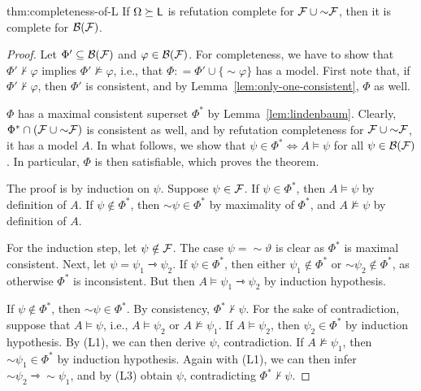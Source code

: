\documentclass[a4paper,english,fleqn,11pt,final]{scrartcl}
\makeatletter
\newcommand{\ie}{i.e.\@\xspace}
\newcommand{\negg}{{\sim}}
\newcommand{\calB}{\protect\ensuremath{\mathcal{B}}}
\newcommand{\calF}{\protect\ensuremath{\mathcal{F}}}
\newcommand{\sfL}{\protect\ensuremath{\mathsf{L}}}
\providecommand{\dfn}{\mathrel{\mathop:}=}
\newcommand{\timp}{\rightarrowtriangle}
\newcommand{\Deriv}[1]{{\normalfont\textsf{#1}}}
\theoremstyle{plain}
\theoremstyle{definition}
\makeatother
\begin{document}
\begin{reptheorem}{thm:completeness-of-L}
If $\Omega \succeq \sfL$ is refutation complete for $\calF \cup \negg \calF$, then it is complete for $\calB(\calF)$.
\end{reptheorem}
\begin{proof}
Let $\Phi' \subseteq \calB(\calF)$ and $\varphi \in \calB(\calF)$.
For completeness, we have to show that $\Phi' \nvdash \varphi$ implies $\Phi' \nvDash \varphi$, \ie, that $\Phi \dfn \Phi' \cup \{\negg\varphi\}$ has a model.
First note that, if $\Phi' \nvdash \varphi$, then $\Phi'$ is consistent, and by Lemma~\ref{lem:only-one-consistent}, $\Phi$ as well.




$\Phi$ has a maximal consistent superset $\Phi^*$ by Lemma~\ref{lem:lindenbaum}.
Clearly, $\Phi^* \cap (\calF \cup \negg \calF)$ is consistent as well, and by refutation completeness for $\calF \cup \negg \calF$, it has a model $A$.
In what follows, we show that $\psi \in \Phi^* \Leftrightarrow A\vDash \psi$ for all $\psi \in \calB(\calF)$.
In particular, $\Phi$ is then satisfiable, which proves the theorem.

The proof is by induction on $\psi$.
Suppose $\psi \in \calF$.
If $\psi \in\Phi^*$, then $A\vDash\psi$ by definition of $A$.
If $\psi \notin \Phi^*$, then $\negg\psi \in \Phi^*$ by maximality of $\Phi^*$, and $A \nvDash \psi$ by definition of $A$.

For the induction step, let $\psi \notin \calF$.
The case $\psi = \negg \vartheta$ is clear as $\Phi^*$ is maximal consistent.
Next, let $\psi = \psi_1 \timp \psi_2$.
If $\psi\in\Phi^*$, then either $\psi_1\notin\Phi^*$ or $\negg\psi_2\notin\Phi^*$, as otherwise $\Phi^*$ is inconsistent.
But then $A\vDash\psi_1\timp\psi_2$ by induction hypothesis.

If $\psi\notin\Phi^*$, then $\negg\psi\in\Phi^*$.
By consistency, $\Phi^* \nvdash \psi$.
For the sake of contradiction, suppose that $A \vDash \psi$, \ie, $A \vDash \psi_2$ or $A \nvDash \psi_1$.
If $A\vDash\psi_2$, then $\psi_2 \in\Phi^*$ by induction hypothesis.
By \Deriv{(L1)}, we can then derive $\psi$, contradiction.
If $A\nvDash\psi_1$, then $\negg\psi_1 \in \Phi^*$ by induction hypothesis.
Again with \Deriv{(L1)}, we can then infer $\negg\psi_2 \timp \negg\psi_1$, and by \Deriv{(L3)} obtain $\psi$, contradicting $\Phi^* \nvdash \psi$.
\end{proof}
 
\end{document}

